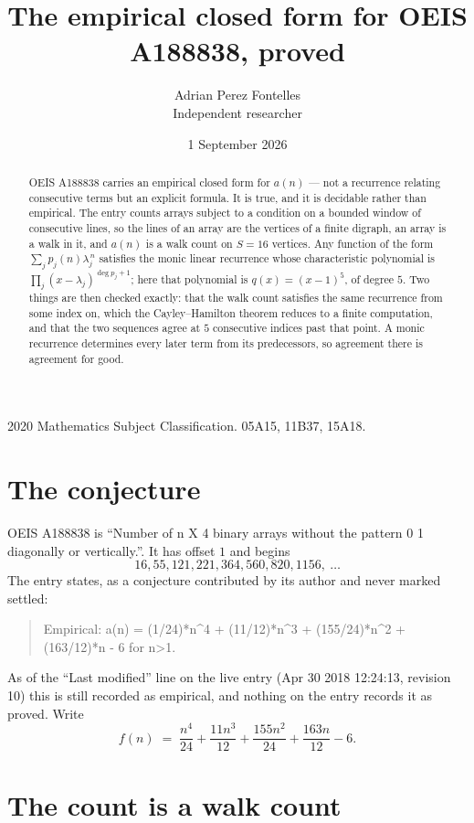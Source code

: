 \documentclass[11pt,a4paper]{article}
\title{The empirical closed form for OEIS A188838, proved}
\author{Adrian Perez Fontelles\\ \small Independent researcher}
\date{1 September 2026}
\theoremstyle{plain}
\theoremstyle{definition}
\begin{document}
\maketitle

\begin{abstract}
OEIS A188838 carries an empirical closed form for $a(n)$ --- not a recurrence relating
consecutive terms but an explicit formula. It is true, and it is decidable rather than
empirical. The entry counts arrays subject to a condition on a bounded window of consecutive lines, so the lines of an array are the
vertices of a finite digraph, an array is a walk in it, and $a(n)$ is a walk count on
$S=16$ vertices. Any function of the form $\sum_j p_j(n)\lambda_j^{\,n}$ satisfies the
monic linear recurrence whose characteristic polynomial is
$\prod_j(x-\lambda_j)^{\deg p_j+1}$; here that polynomial is $q(x)=(x-1)^{5}$, of degree
$5$. Two things are then checked exactly: that the walk count satisfies the same
recurrence from some index on, which the Cayley--Hamilton theorem reduces to a finite
computation, and that the two sequences agree at $5$ consecutive indices past that
point. A monic recurrence determines every later term from its predecessors, so agreement
there is agreement for good.
\end{abstract}

\noindent\small 2020 Mathematics Subject Classification. 05A15, 11B37, 15A18.\normalsize

\section{The conjecture}

OEIS A188838 is ``Number of n X 4 binary arrays without the pattern 0 1 diagonally or vertically.''. It has offset $1$ and begins
\[
16, 55, 121, 221, 364, 560, 820, 1156,\ \dots
\]
The entry states, as a conjecture contributed by its author and never marked settled:
\begin{quote}
Empirical: a(n) = (1/24)*n\^{}4 + (11/12)*n\^{}3 + (155/24)*n\^{}2 + (163/12)*n - 6 for n>1.
\end{quote}
As of the ``Last modified'' line on the live entry (Apr 30 2018 12:24:13, revision 10) this is still
recorded as empirical, and nothing on the entry records it as proved. Write
\[
f(n)\;=\;\frac{n^{4}}{24} + \frac{11 n^{3}}{12} + \frac{155 n^{2}}{24} + \frac{163 n}{12} - 6.
\]

\section{The count is a walk count}
\end{document}
